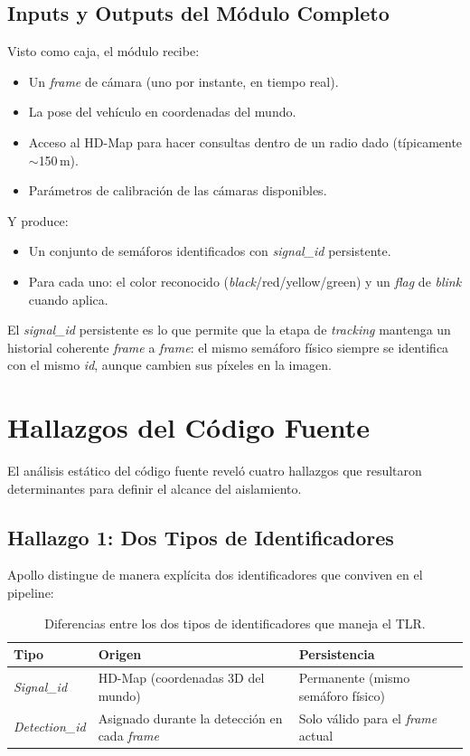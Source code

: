 \subsection{Inputs y Outputs del Módulo Completo}

Visto como caja, el módulo recibe:

\begin{itemize}
    \item Un \textit{frame} de cámara (uno por instante, en tiempo real).
    \item La pose del vehículo en coordenadas del mundo.
    \item Acceso al HD-Map para hacer consultas dentro de un radio dado (típicamente $\sim$150\,m).
    \item Parámetros de calibración de las cámaras disponibles.
\end{itemize}

Y produce:

\begin{itemize}
    \item Un conjunto de semáforos identificados con \textit{signal\_id} persistente.
    \item Para cada uno: el color reconocido (\textit{black}/red/yellow/green) y un \textit{flag} de \textit{blink} cuando aplica.
\end{itemize}

El \textit{signal\_id} persistente es lo que permite que la etapa de \textit{tracking} mantenga un historial coherente \textit{frame} a \textit{frame}: el mismo semáforo físico siempre se identifica con el mismo \textit{id}, aunque cambien sus píxeles en la imagen.

\section{Hallazgos del Código Fuente}
\label{sec:hallazgos}

El análisis estático del código fuente reveló cuatro hallazgos que resultaron determinantes para definir el alcance del aislamiento.

\subsection{Hallazgo 1: Dos Tipos de Identificadores}

Apollo distingue de manera explícita dos identificadores que conviven en el pipeline:

\begin{table}[H]
\centering
\begin{tabular}{|l|p{5cm}|p{5cm}|}
\hline
\textbf{Tipo} & \textbf{Origen} & \textbf{Persistencia} \\
\hline
\textit{Signal\_id} & HD-Map (coordenadas 3D del mundo) & Permanente (mismo semáforo físico) \\
\hline
\textit{Detection\_id} & Asignado durante la detección en cada \textit{frame} & Solo válido para el \textit{frame} actual \\
\hline
\end{tabular}
\caption{Diferencias entre los dos tipos de identificadores que maneja el TLR.}
\end{table}

